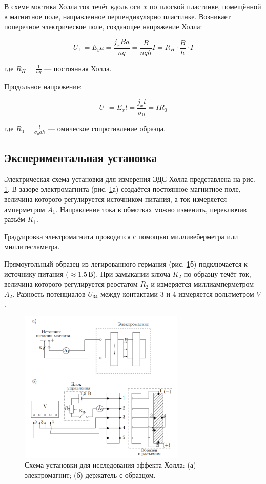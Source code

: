 В схеме мостика Холла ток течёт вдоль оси \( x \) по плоской пластинке, помещённой в магнитное поле, направленное перпендикулярно пластинке. Возникает поперечное электрическое поле, создающее напряжение Холла:

\begin{equation}
U_\perp = E_ya = \frac{j_x B a}{n q} = \frac{B}{nqh} I = R_H \cdot \frac{B}{h} \cdot I
\end{equation}

где \( R_H = \frac{1}{nq} \) — постоянная Холла.

Продольное напряжение:

\begin{equation}
U_\parallel = E_x l = \frac{j_x l}{\sigma_0} = I R_0
\end{equation}

где \( R_0 = \frac{l}{\sigma_0 a h} \) — омическое сопротивление образца.

\subsection{Экспериментальная установка}

Электрическая схема установки для измерения ЭДС Холла представлена на рис. \ref{r1}. В зазоре электромагнита (рис. \ref{r1}а) создаётся постоянное магнитное поле, величина которого регулируется источником питания, а ток измеряется амперметром \(A_1\). Направление тока в обмотках можно изменить, переключив разъём \(K_1\).

Градуировка электромагнита проводится с помощью милливеберметра или миллитесламетра.

Прямоугольный образец из легированного германия (рис. \ref{r1}б) подключается к источнику питания (\(\approx 1.5 \, \text{В}\)). При замыкании ключа \(K_2\) по образцу течёт ток, величина которого регулируется реостатом \(R_2\) и измеряется миллиамперметром \(A_2\). Разность потенциалов \(U_{34}\) между контактами 3 и 4 измеряется вольтметром \(V\).

\begin{figure}[H]
    \centering
    \includegraphics[width=0.7\textwidth]{pictures/r1.png}
    \caption{Схема установки для исследования эффекта Холла: (а) электромагнит; (б) держатель с образцом.}
    \label{r1}
\end{figure}

